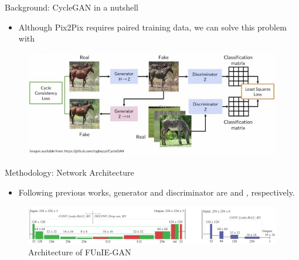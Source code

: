\documentclass{cubeamer}
\begin{document}
\begin{frame}{Background: CycleGAN in a nutshell}
    \begin{itemize}
        \item Although Pix2Pix requires paired training data, we can solve this problem with 
    \end{itemize}
    \begin{figure}
        \centering
        \includegraphics[width=.8\textwidth]{figures/cyclegan-architecture.jpg}
    \end{figure}
\end{frame}

\begin{frame}{Methodology: Network Architecture}
    \begin{itemize}
        \item Following previous works, generator and discriminator are  and , respectively.
    \end{itemize}
    \begin{figure}
        \centering
        \includegraphics[width=1.0\textwidth]{figures/funie-architecture.PNG}
        \caption{Architecture of FUnIE-GAN \cite{funie-gan}}
    \end{figure}
\end{frame}
\end{document}
